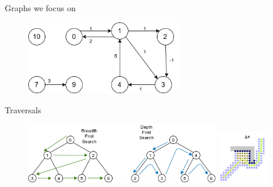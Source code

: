 \documentclass[rgb]{beamer}
\begin{document}
        \begin{frame}{Graphs we focus on}
            \begin{figure}
                \begin{center}
                \includegraphics[keepaspectratio, height=0.8\textheight, width=0.6\textwidth]{img/data_struct_gr.png}
                \end{center}
            \end{figure}
        \end{frame}
    
        \begin{frame}{Traversals}
            \begin{figure}
                \begin{center}
                \includegraphics[keepaspectratio, height=0.8\textheight, width=0.75\textwidth]{img/bfs-dfs.png} \hfill
                \includegraphics[keepaspectratio, height=0.8\textheight, width=0.2\textwidth]{img/astar.png}
                \end{center}
            \end{figure}
        \end{frame}
                    
\end{document}

